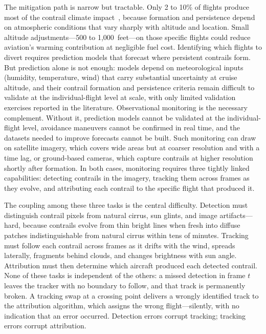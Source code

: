 \documentclass[1p,11pt]{elsarticle}
\begin{document}
The mitigation path is narrow but tractable. Only 2 to 10\% of flights produce most of the contrail climate impact~\cite{teoh2020mitigating}, because formation and persistence depend on atmospheric conditions that vary sharply with altitude and location. Small altitude adjustments---500 to 1,000~feet---on those specific flights could reduce aviation's warming contribution at negligible fuel cost. Identifying which flights to divert requires prediction models that forecast where persistent contrails form. But prediction alone is not enough: models depend on meteorological inputs (humidity, temperature, wind) that carry substantial uncertainty at cruise altitude, and their contrail formation and persistence criteria
remain difficult to validate at the individual-flight level at scale, with only limited validation exercises reported in the literature. Observational monitoring is the necessary complement. Without it, prediction models cannot be validated at the individual-flight level, avoidance maneuvers cannot be confirmed in real time, and the datasets needed to improve forecasts cannot be built. Such monitoring can draw on satellite imagery, which covers wide areas but at coarser resolution and with a time lag, or ground-based cameras, which capture contrails at higher resolution shortly after formation. In both cases, monitoring requires three tightly linked capabilities: detecting contrails in the imagery, tracking them across frames as they evolve, and attributing each contrail to the specific flight that produced it.

The coupling among these three tasks is the central difficulty. Detection must distinguish contrail pixels from natural cirrus, sun glints, and image artifacts---hard, because contrails evolve from thin bright lines when fresh into diffuse patches indistinguishable from natural cirrus within tens of minutes. Tracking must follow each contrail across frames as it drifts with the wind, spreads laterally, fragments behind clouds, and changes brightness with sun angle. Attribution must then determine which aircraft produced each detected contrail. None of these tasks is independent of the others: a missed detection in frame $t$ leaves the tracker with no boundary to follow, and that track is permanently broken. A tracking swap at a crossing point delivers a wrongly identified track to the attribution algorithm, which assigns the wrong flight---silently, with no indication that an error occurred. Detection errors corrupt tracking; tracking errors corrupt attribution.
\end{document}
